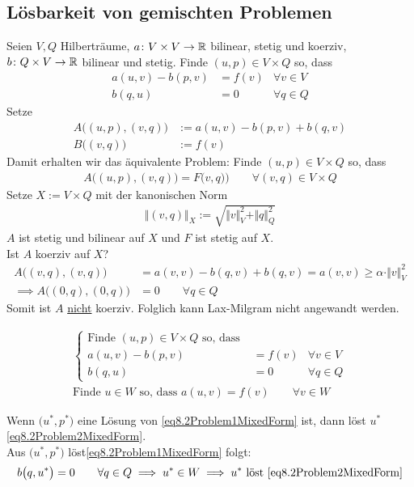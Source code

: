 \subsection{Lösbarkeit von gemischten Problemen}
Seien $V,Q$ Hilberträume, $a\colon V\times V\to\mathbb{R}$ bilinear, stetig und koerziv, $b\colon Q\times V\to\mathbb{R}$ bilinear und stetig.\nl
Finde $(u,p)\in V\times Q$ so, dass
\begin{align*}
	a(u,v)-b(p,v)&=f(v) &\forall v\in V\\
	b(q,u) &=0 &\forall q\in Q
\end{align*}
Setze 
\begin{align*}
	A\big((u,p),(v,q)\big) &:=a(u,v)-b(p,v)+b(q,v)\\
	B\big((v,q)\big) &:= f(v)
\end{align*}
Damit erhalten wir das äquivalente Problem:
Finde $(u,p)\in V\times Q$ so, dass
\begin{align*}
	A\big((u,p),(v,q)\big)=F\big(v,q)\big) \qquad\forall(v,q)\in V\times Q
\end{align*}
Setze $X:=V\times Q$ mit der kanonischen Norm
\begin{align*}
	\big\Vert(v,q)\big\Vert_X:=\sqrt{\Vert v\Vert_V^2+\Vert q\Vert_Q^2}
\end{align*}
$A$ ist stetig und bilinear auf $X$ und $F$ ist stetig auf $X$.\\
Ist $A$ koerziv auf $X$?
\begin{align*}
	A\big((v,q),(v,q)\big)
	&=a(v,v)-b(q,v)+b(q,v)
	=a(v,v)\geq\alpha\cdot\Vert v\Vert^2_V\\
	\implies
	A\big((0,q),(0,q)\big)&=0\qquad\forall q\in Q
\end{align*}
Somit ist $A$ \underline{nicht} koerziv.
Folglich kann Lax-Milgram nicht angewandt werden.

\begin{align}\label{eq8.2Problem1MixedForm}\tag{1}
		\left\lbrace
		\begin{array}{rlrr}
			\text{Finde }(u,p)\in V\times Q\text{ so, dass }&\\
			a(u,v)-b(p,v)&=f(v) &\forall v\in V\\
			b(q,u)&=0 &\forall q\in Q
		\end{array}\right.\\
		\label{eq8.2Problem2MixedForm}\tag{2}
		\text{Finde $u\in W$ so, dass }
		a(u,v)= f(v)\qquad\forall v\in W
\end{align}

Wenn $\big(u^\ast,p^\ast\big)$ eine Lösung von \eqref{eq8.2Problem1MixedForm} ist, dann löst $u^\ast$ \eqref{eq8.2Problem2MixedForm}.\\
Aus $\big(u^\ast,p^\ast\big)$ löst\eqref{eq8.2Problem1MixedForm} folgt:
\begin{align*}
	b\big(q,u^\ast\big)=0\qquad\forall q\in Q
	\implies u^\ast\in W
	\implies u^\ast\text{ löst }\eqref{eq8.2Problem2MixedForm}
\end{align*}

